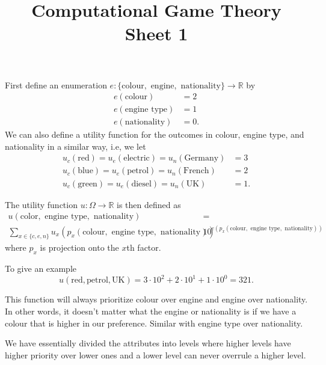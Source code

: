 \documentclass[a4paper]{article}
\title{Computational Game Theory \\ Sheet 1}
\begin{document}
  \maketitle
  \begin{exercise}{1}
    First define an enumeration $ e: \{\text{colour}, \text{ engine}, \text{ nationality}\} \to \mathbb{R} $
    by
    \begin{align*}
      e(\text{colour}) &= 2 \\
      e(\text{engine type}) &= 1 \\
      e(\text{nationality}) &= 0
    .\end{align*}
    We can also define a utility function for the outcomes in colour, engine type, and nationality in a similar way, i.e, we let
    \begin{align*}
      u_c(\text{red}) = u_e(\text{electric}) = u_n(\text{Germany}) &= 3 \\
      u_c(\text{blue}) = u_e(\text{petrol}) = u_n(\text{French}) &= 2 \\
      u_c(\text{green}) = u_e(\text{diesel}) = u_n(\text{UK}) &= 1
    .\end{align*}

    The utility function $ u: \Omega \to \mathbb{R} $ is then
    defined as
    \begin{align*}
      u(\text{color}, \text{ engine type}, \text{ nationality})& = \\  \sum_{x \in \{c, e, n\}} u_x(p_x(\text{colour}, \text{ engine type}, \text{ nationality}))& 10^{e(p_x(\text{colour}, \text{ engine type}, \text{ nationality}))}
    \end{align*}
    where $ p_x $ is projection onto the $ x $th factor.

    To give an example
    \begin{equation*}
      u(\text{red}, \text{petrol}, \text{UK}) = 3\cdot 10^{2} + 2 \cdot 10^{1} + 1\cdot 10^{0} = 321
    .\end{equation*}

    This function will always prioritize colour over engine and engine over nationality. In other words, it doesn't matter what the engine or nationality is if we have a colour that is higher in our preference. Similar with engine type over nationality.

    We have essentially divided the attributes into levels where higher levels have higher priority over lower ones and a lower level can never overrule a higher level.
  \end{exercise}
\end{document}
